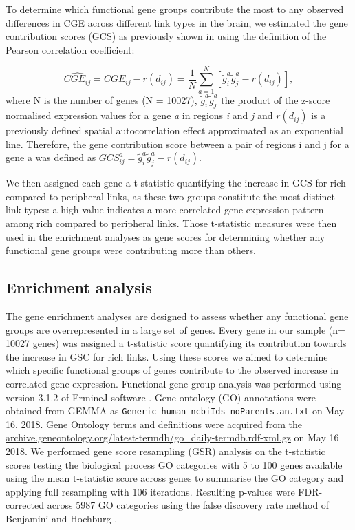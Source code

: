 To determine which functional gene groups contribute the most to any observed differences in CGE across different link types in the brain, we estimated the gene contribution scores (GCS) as previously shown in \citep{Fulcher2016} using the definition of the Pearson correlation coefficient: 

\begin{equation}
    \label{eqn:Ch5Eq5}
    \widehat{CGE_{ij}} = CGE_{ij} - r(d_{ij}) = \frac{1}{N}\sum_{a=1}^{N}[\widetilde{g}_{i}^{a}\widetilde{g}_{j}^{a} - r(d_{ij})],
\end{equation} 
where N is the number of genes (N = \num{10 027}), $\widetilde{g}_{i}^{a} \widetilde{g}_{j}^{a}$ the product of the z-score normalised expression values for a gene \textit{a} in regions \textit{i} and \textit{j} and $r(d_{ij})$ is a previously defined spatial autocorrelation effect approximated as an exponential line. Therefore, the gene contribution score between a pair of regions i and j for a gene a was defined as $GCS_{ij}^{a}= \widetilde{g}_{i}^{a}\widetilde{g}_{j}^{a} - r(d_{ij})$.

We then assigned each gene a t-statistic quantifying the increase in GCS for rich compared to peripheral links, as these two groups constitute the most distinct link types: a high value indicates a more correlated gene expression pattern among rich compared to peripheral links. Those t-statistic measures were then used in the enrichment analyses as gene scores for determining whether any functional gene groups were contributing more than others. 

\subsection{Enrichment analysis}
\label{sec:enrichment}
The gene enrichment analyses are designed to assess whether any functional gene groups are overrepresented in a large set of genes. Every gene in our sample (n= \num{10027} genes) was assigned a t-statistic score quantifying its contribution towards the increase in GSC for rich links. Using these scores we aimed to determine which specific functional groups of genes contribute to the observed increase in correlated gene expression. Functional gene group analysis was performed using version 3.1.2 of ErmineJ software \citep{Gillis2010}. Gene ontology (GO) \citep{Ashburner2000} annotations were obtained from GEMMA \citep{Zoubarev2012} as \texttt{Generic\_human\_ncbiIds\_noParents.an.txt} on May 16, 2018. Gene Ontology terms and definitions were acquired from the \url{archive.geneontology.org/latest-termdb/go_daily-termdb.rdf-xml.gz} on May 16 2018. We performed gene score resampling (GSR) analysis on the t-statistic scores testing the biological process GO categories with 5 to 100 genes available using the mean t-statistic score across genes to summarise the GO category and applying full resampling with 106 iterations. Resulting p-values were FDR-corrected across \num{5987} GO categories using the false discovery rate method of Benjamini and Hochburg \citep{Benjamini1995}.

